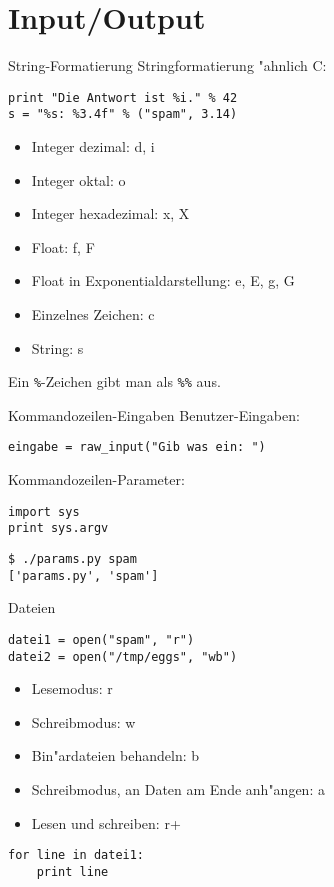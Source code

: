 \section{Input/Output}

\begin{frame}[fragile]{String-Formatierung}
Stringformatierung "ahnlich C: 
\begin{lstlisting}[style=Python]
print "Die Antwort ist %i." % 42
s = "%s: %3.4f" % ("spam", 3.14)
\end{lstlisting}
\begin{itemize}
\item \alert{Integer dezimal}: d, i
\item Integer oktal: o
\item Integer hexadezimal: x, X
\item \alert{Float}: f, F
\item Float in Exponentialdarstellung: e, E, g, G
\item Einzelnes Zeichen: c
\item \alert{String}: s
\end{itemize}
Ein \texttt{\%}-Zeichen gibt man als \texttt{\%\%} aus.
\end{frame}

\begin{frame}[fragile]{Kommandozeilen-Eingaben}
Benutzer-Eingaben:
\begin{lstlisting}[style=Python]
eingabe = raw_input("Gib was ein: ")
\end{lstlisting}
\vspace{3mm}
Kommandozeilen-Parameter:
\begin{lstlisting}[style=Python]
import sys
print sys.argv
\end{lstlisting}
\begin{lstlisting}[style=Shell]
$ ./params.py spam
['params.py', 'spam']
\end{lstlisting} %
\end{frame}

\begin{frame}[fragile]{Dateien}
\begin{lstlisting}[style=Python]
datei1 = open("spam", "r")
datei2 = open("/tmp/eggs", "wb")
\end{lstlisting}
\begin{itemize}
\item Lesemodus: r
\item Schreibmodus: w
\item Bin"ardateien behandeln: b
\item Schreibmodus, an Daten am Ende anh"angen: a
\item Lesen und schreiben: r+
\end{itemize}
\begin{lstlisting}
for line in datei1:
    print line
\end{lstlisting}
\end{frame}

